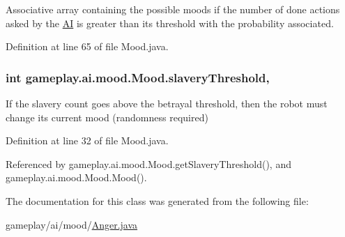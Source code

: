 Associative array containing the possible moods if the number of done actions asked by the \hyperlink{classgameplay_1_1ai_1_1_a_i}{A\-I} is greater than its threshold with the probability associated. 



Definition at line 65 of file Mood.\-java.

\hypertarget{classgameplay_1_1ai_1_1mood_1_1_mood_a12c9abed7c077f9013956cda08e41619}{
\subsubsection[{slavery\-Threshold}]{\setlength{\rightskip}{0pt plus 5cm}int gameplay.\-ai.\-mood.\-Mood.\-slavery\-Threshold\hspace{0.3cm}{\ttfamily [protected]}, {\ttfamily [inherited]}}}\label{classgameplay_1_1ai_1_1mood_1_1_mood_a12c9abed7c077f9013956cda08e41619}


If the slavery count goes above the betrayal threshold, then the robot must change its current mood (randomness required) 



Definition at line 32 of file Mood.\-java.



Referenced by gameplay.\-ai.\-mood.\-Mood.\-get\-Slavery\-Threshold(), and gameplay.\-ai.\-mood.\-Mood.\-Mood().



The documentation for this class was generated from the following file\-:\begin{DoxyCompactItemize}
\item 
gameplay/ai/mood/\hyperlink{_anger_8java}{Anger.\-java}\end{DoxyCompactItemize}
